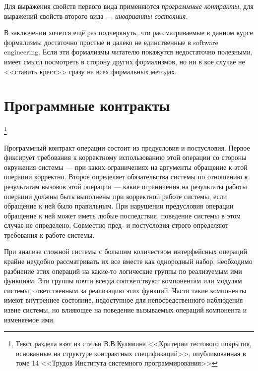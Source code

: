 \documentclass[14pt, twoside]{extreport}
\begin{document}
Для выражения свойств первого вида применяются \emph{программные контракты}, для выражений свойств второго вида --- \emph{инварианты состояния}.

В заключении хочется ещё раз подчеркнуть, что рассматриваемые в данном курсе формализмы достаточно простые и далеко не единственные в software engineering. Если эти формализмы читателю покажутся недостаточно полезными, имеет смысл посмотреть в сторону других формализмов, но ни в кое случае не <<ставить крест>> сразу на всех формальных методах.


\section{Программные контракты}\footnote{Текст раздела взят из статьи В.В.Кулямина <<Критерии тестового покрытия, основанные на структуре контрактных спецификаций>>, опубликованная в томе 14 <<Трудов Института системного программирования>>}

Программный контракт операции состоит из предусловия и постусловия. Первое фиксирует требования к корректному использованию этой операции со стороны окружения системы — при каких ограничениях на аргументы обращение к этой операции корректно. Второе определяет обязательства системы по отношению к результатам вызовов этой операции — какие ограничения на результаты работы операции должны быть выполнены при корректной работе системы, если обращение к ней было правильным. При нарушении предусловия операции обращение к ней может иметь любые последствия, поведение системы в этом случае не определено. Совместно пред- и постусловия строго определяют требования к работе системы.

При анализе сложной системы с большим количеством интерфейсных операций крайне неудобно рассматривать их все вместе как однородный набор, необходимо разбиение этих операций на какие-то логические группы по реализуемым ими функциям. Эти группы почти всегда соответствуют компонентам или модулям системы, ответственным за реализацию этих функций. Часто такие компоненты имеют внутреннее состояние, недоступное для непосредственного наблюдения извне системы, но влияющее на поведение вызываемых операций компонента и изменяемое ими.
\end{document}
